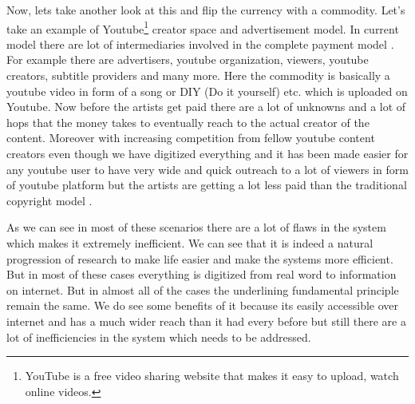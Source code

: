 Now, lets take another look at this and flip the currency with a commodity. Let's take an example of Youtube\footnote{YouTube is a free video sharing website that makes it easy to upload, watch online videos.} creator space and advertisement model. In current model there are lot of intermediaries involved in the complete payment model \cite{bryanm8}. For example there are advertisers, youtube organization, viewers, youtube creators, subtitle providers and many more. Here the commodity is basically a youtube video in form of a song or DIY (Do it yourself) etc. which is uploaded on Youtube. Now before the artists get paid there are a lot of unknowns and a lot of hops that the money takes to eventually reach to the actual creator of the content. Moreover with increasing competition from fellow youtube content creators even though we have digitized everything and it has been made easier for any youtube user to have very wide and quick outreach to a lot of viewers in form of youtube platform but the artists are getting a lot less paid than the traditional copyright model \cite{tapscott1,helienne9}.


As we can see in most of these scenarios there are a lot of flaws in the system which makes it extremely inefficient. We can see that it is indeed a natural progression of research to make life easier and make the systems more efficient. But in most of these cases everything is digitized from real word to information on internet. But in almost all of the cases the underlining fundamental principle remain the same. We do see some benefits of it because its easily accessible over internet and has a much wider reach than it had every before but still there are a lot of inefficiencies in the system which needs to be addressed.


